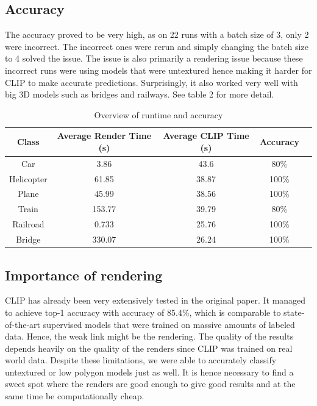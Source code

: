 \documentclass[a4paper,11pt,oneside]{article}
\begin{document}
  
  
  \subsection{Accuracy}
  The accuracy proved to be very high, as on 22 runs with a batch size of 3, only 2 were incorrect. The incorrect ones were rerun and simply changing the batch size to 4 solved the issue. The issue is also primarily a rendering issue because these incorrect runs were using models that were untextured hence making it harder for CLIP to make accurate predictions. Surprisingly, it also worked very well with big 3D models such as bridges and railways. See table 2 for more detail.
  
\begin{table}[H]
\label{fig:accuracy}
\caption{Overview of runtime and accuracy}
\centering
\begin{tabular}{|c|c|c|c|c}
\hline
\textbf{Class} & \textbf{Average Render Time (s)} & \textbf{Average CLIP Time (s)} &  \textbf{Accuracy}\\
\hline
Car & 3.86 & 43.6 & 80\% \\
\hline
Helicopter & 61.85 & 38.87 & 100\%\\
\hline
Plane & 45.99 & 38.56 & 100\%\\
\hline
Train & 153.77 & 39.79 & 80\%\\
\hline
Railroad & 0.733 & 25.76 & 100\% \\
\hline
Bridge & 330.07 & 26.24 & 100\%\\
\hline
\end{tabular}

\end{table}
  
  \subsection{Importance of rendering}
  CLIP has already been very extensively tested in the original paper. It managed to achieve top-1 accuracy with accuracy of 85.4\%, which is comparable to state-of-the-art supervised models that were trained on massive amounts of labeled data. Hence, the weak link might be the rendering. The quality of the results depends heavily on the quality of the renders since CLIP was trained on real world data. Despite these limitations, we were able to accurately classify untextured or low polygon models just as well. It is hence necessary to find a sweet spot where the renders are good enough to give good results and at the same time be computationally cheap.
  
\end{document}
